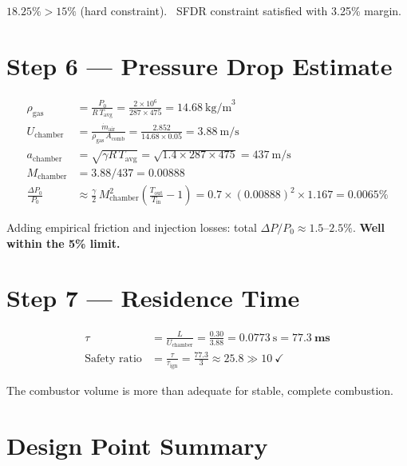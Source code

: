 \documentclass[12pt,a4paper]{report}
\begin{document}
\begin{resultbox}
$18.25\% > 15\%$ (hard constraint).\ \checkmark\quad
SFDR constraint satisfied with 3.25\% margin.
\end{resultbox}

\section{Step 6 — Pressure Drop Estimate}

\begin{align}
  \rho_\text{gas}
  &= \frac{P_0}{R\,T_\text{avg}}
  = \frac{2\times10^6}{287\times475}
  = 14.68\ \text{kg/m}^3\\[6pt]
  U_\text{chamber}
  &= \frac{\dot{m}_\text{air}}{\rho_\text{gas}\,A_\text{comb}}
  = \frac{2.852}{14.68\times0.05}
  = 3.88\ \text{m/s}\\[6pt]
  a_\text{chamber}
  &= \sqrt{\gamma R\,T_\text{avg}}
  = \sqrt{1.4\times287\times475}
  = 437\ \text{m/s}\\[6pt]
  M_\text{chamber}
  &= 3.88/437 = 0.00888\\[6pt]
  \frac{\Delta P_0}{P_0}
  &\approx \frac{\gamma}{2}\,M_\text{chamber}^2
          \!\left(\frac{T_\text{out}}{T_\text{in}}-1\right)
  = 0.7\times(0.00888)^2\times1.167
  = 0.0065\%
\end{align}

Adding empirical friction and injection losses: total
$\Delta P/P_0 \approx 1.5$--$2.5\%$. \textbf{Well within the 5\% limit.}

\section{Step 7 — Residence Time}

\begin{align}
  \tau
  &= \frac{L}{U_\text{chamber}}
  = \frac{0.30}{3.88}
  = 0.0773\ \text{s} = \mathbf{77.3\ \text{ms}}\\[6pt]
  \text{Safety ratio}
  &= \frac{\tau}{\tau_\text{ign}}
  = \frac{77.3}{3} \approx 25.8 \gg 10\ \checkmark
\end{align}

The combustor volume is more than adequate for stable, complete combustion.

\section{Design Point Summary}
\end{document}
